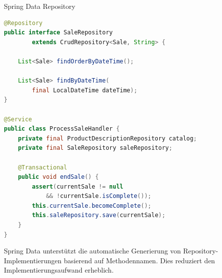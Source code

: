 \begin{example}{Spring Data Repository}
\begin{lstlisting}[language=Java, style=base]
@Repository
public interface SaleRepository 
        extends CrudRepository<Sale, String> {
    
    List<Sale> findOrderByDateTime();
    
    List<Sale> findByDateTime(
        final LocalDateTime dateTime);
}

@Service
public class ProcessSaleHandler {
    private final ProductDescriptionRepository catalog;
    private final SaleRepository saleRepository;
    
    @Transactional
    public void endSale() {
        assert(currentSale != null 
            && !currentSale.isComplete());
        this.currentSale.becomeComplete();
        this.saleRepository.save(currentSale);
    }
}
\end{lstlisting}
\end{example}

\begin{remark}
Spring Data unterstützt die automatische Generierung von Repository-Implementierungen basierend auf Methodennamen. Dies reduziert den Implementierungsaufwand erheblich.
\end{remark}